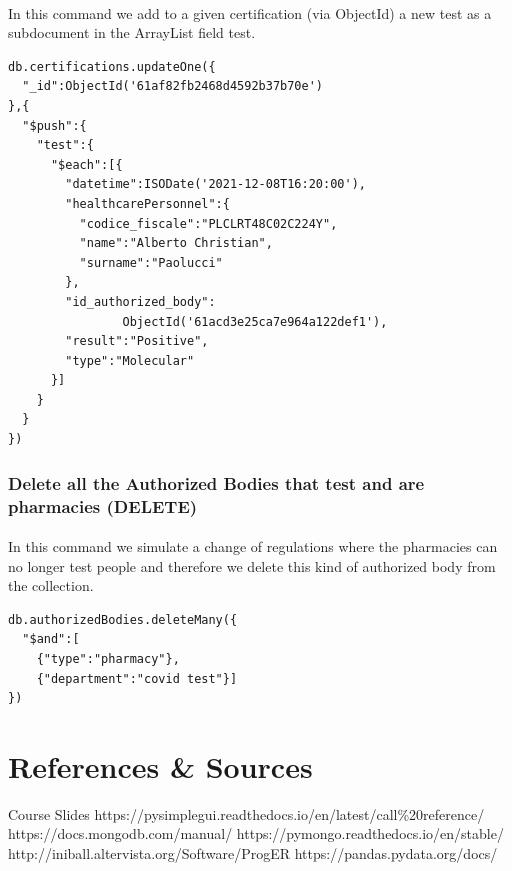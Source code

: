 \documentclass[a4paper,12pt]{article}
\begin{document}
\paragraph{} In this command we add to a given certification (via ObjectId) a new test as a subdocument in the ArrayList field test.
\begin{tcolorbox}[colback=orange!5!white,colframe=orange!75!black,title=COMMAND]
\begin{verbatim}
db.certifications.updateOne({
  "_id":ObjectId('61af82fb2468d4592b37b70e')
},{
  "$push":{
    "test":{
      "$each":[{
        "datetime":ISODate('2021-12-08T16:20:00'),
        "healthcarePersonnel":{
          "codice_fiscale":"PLCLRT48C02C224Y",
          "name":"Alberto Christian",
          "surname":"Paolucci"
        },
        "id_authorized_body":
                ObjectId('61acd3e25ca7e964a122def1'),
        "result":"Positive",
        "type":"Molecular"
      }]
    }
  }
})
\end{verbatim}
\end{tcolorbox}


\subsubsection{Delete all the Authorized Bodies that test and are pharmacies (DELETE)}
\paragraph{} In this command we simulate a change of regulations where the pharmacies can no longer test people and therefore we delete this kind of authorized body from the collection.
\begin{tcolorbox}[colback=orange!5!white,colframe=orange!75!black,title=COMMAND]
\begin{verbatim}
db.authorizedBodies.deleteMany({
  "$and":[
    {"type":"pharmacy"},
    {"department":"covid test"}]
})

\end{verbatim}
\end{tcolorbox}
\clearpage
\section{References \& Sources}
  \begin{thebibliography}{9}
    \bibitem{} Course Slides
    \bibitem{} https://pysimplegui.readthedocs.io/en/latest/call\%20reference/
    \bibitem{} https://docs.mongodb.com/manual/
    \bibitem{} https://pymongo.readthedocs.io/en/stable/
    \bibitem{} http://iniball.altervista.org/Software/ProgER
    \bibitem{} https://pandas.pydata.org/docs/
  \end{thebibliography}
\end{document}
